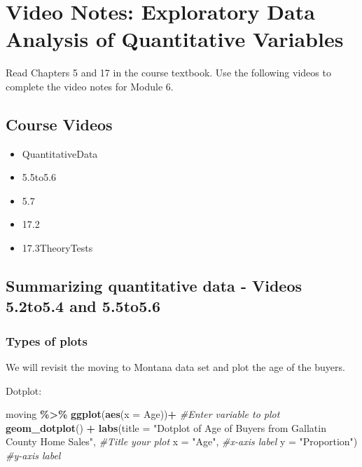 \documentclass[
]{report}
\newenvironment{Shaded}{\begin{snugshade}}{\end{snugshade}}
\newcommand{\AttributeTok}[1]{\textcolor[rgb]{0.13,0.29,0.53}{#1}}
\newcommand{\CommentTok}[1]{\textcolor[rgb]{0.56,0.35,0.01}{\textit{#1}}}
\newcommand{\FunctionTok}[1]{\textcolor[rgb]{0.13,0.29,0.53}{\textbf{#1}}}
\newcommand{\NormalTok}[1]{#1}
\newcommand{\SpecialCharTok}[1]{\textcolor[rgb]{0.81,0.36,0.00}{\textbf{#1}}}
\newcommand{\StringTok}[1]{\textcolor[rgb]{0.31,0.60,0.02}{#1}}
\begin{document}
\newpage

\section{Video Notes: Exploratory Data Analysis of Quantitative Variables}\label{video-notes-exploratory-data-analysis-of-quantitative-variables}

Read Chapters 5 and 17 in the course textbook. Use the following videos to complete the video notes for Module 6.

\subsection{Course Videos}\label{course-videos-4}

\begin{itemize}
\item
  QuantitativeData
\item
  5.5to5.6
\item
  5.7
\item
  17.2
\item
  17.3TheoryTests
\end{itemize}


\subsection*{Summarizing quantitative data - Videos 5.2to5.4 and 5.5to5.6}\label{summarizing-quantitative-data---videos-5.2to5.4-and-5.5to5.6}

\subsubsection*{Types of plots}\label{types-of-plots}

We will revisit the moving to Montana data set and plot the age of the buyers.

Dotplot:

\vspace{0.5in}

\begin{Shaded}
\begin{Highlighting}[]
\NormalTok{moving }\SpecialCharTok{\%\textgreater{}\%}
  \FunctionTok{ggplot}\NormalTok{(}\FunctionTok{aes}\NormalTok{(}\AttributeTok{x =}\NormalTok{ Age))}\SpecialCharTok{+} \CommentTok{\#Enter variable to plot}
  \FunctionTok{geom\_dotplot}\NormalTok{() }\SpecialCharTok{+} 
  \FunctionTok{labs}\NormalTok{(}\AttributeTok{title =} \StringTok{"Dotplot of Age of Buyers from Gallatin }
\StringTok{       County Home Sales"}\NormalTok{, }\CommentTok{\#Title your plot}
       \AttributeTok{x =} \StringTok{"Age"}\NormalTok{, }\CommentTok{\#x{-}axis label}
       \AttributeTok{y =} \StringTok{"Proportion"}\NormalTok{) }\CommentTok{\#y{-}axis label}
\end{Highlighting}
\end{Shaded}
\end{document}

